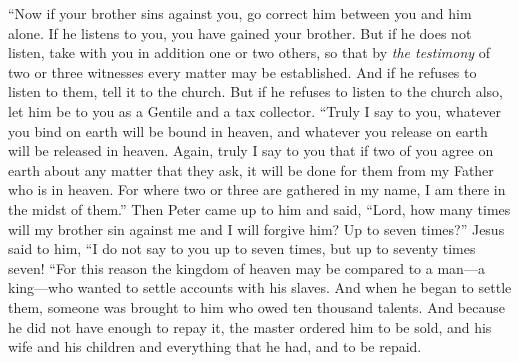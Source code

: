 \begin{biblechapter}
 “Now if your brother sins against you, go correct him between you and him alone. If he listens to you, you have gained your brother.
\verse But if he does not listen, take with you in addition one or two others, so that by \textit{the testimony} of two or three witnesses every matter may be established.
\verse And if he refuses to listen to them, tell it to the church. But if he refuses to listen to the church also, let him be to you as a Gentile and a tax collector.
\verse “Truly I say to you, whatever you bind on earth will be bound in heaven, and whatever you release on earth will be released in heaven.
\verse Again, truly I say to you that if two of you agree on earth about any matter that they ask, it will be done for them from my Father who is in heaven.
\verse For where two or three are gathered in my name, I am there in the midst of them.”
 Then Peter came up to him and said, “Lord, how many times will my brother sin against me and I will forgive him? Up to seven times?”
\verse Jesus said to him, “I do not say to you up to seven times, but up to seventy times seven!
\verse “For this reason the kingdom of heaven may be compared to a man—a king—who wanted to settle accounts with his slaves.
\verse And when he began to settle them, someone was brought to him who owed ten thousand talents.
\verse And because he did not have enough to repay it, the master ordered him to be sold, and his wife and his children and everything that he had, and to be repaid.

\end{biblechapter}

